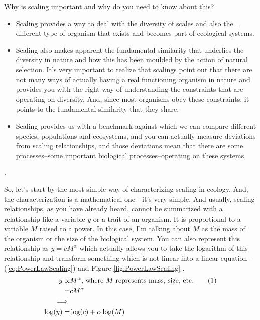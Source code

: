 \documentclass[]{article}
\newcommand\numberthis{\addtocounter{equation}{1}\tag{\theequation}}
\begin{document}
Why is scaling important and why do you need to know about this?
\begin{itemize}
	\item Scaling provides a way to deal with the diversity of scales and also the... different type of organism that exists and becomes part of ecological systems.
	\item Scaling also makes apparent the fundamental similarity that underlies the diversity in nature and how this has been moulded by the action of natural selection. It's very important to realize that scalings point out that there are not many ways of actually having a real functioning organism in nature and provides you with the right way of understanding the constraints that are operating on diversity. And, since most organisms obey these constraints, it points to the fundamental similarity that they share.

	\item Scaling provides us with a  benchmark against which we can compare different species, populations and ecosystems, and you can actually measure deviations from scaling relationships, and those deviations mean that there are some processes--some important biological processes--operating on these systems
\end{itemize}.

So, let's start by the most simple way of characterizing scaling in ecology.
And, the characterization is a mathematical one - it's very simple.
And usually, scaling relationships, as you have already heard, cannot be summarized with
a relationship like a variable $y$ or a trait of an organism.
It is proportional to a variable $M$ raised to a power.
In this case, I'm talking about $M$ as the mass of the organism or the size of the biological system. You can also represent this relationship as $y=c M^\alpha$ which actually allows you to take the logarithm of this relationship and transform something which is not linear into a linear equation--(\ref{eq:PowerLawScaling}) and Figure \ref{fig:PowerLawScaling} .
\begin{align*}
	y \propto& M^{\alpha}\text{, where $M$ represents mass, size, etc.}\numberthis\label{eq:PowerLawScaling}\\
	=& c M^{\alpha}\\
	\implies&\\
	\log(y)=&\log(c) + \alpha \log(M)
\end{align*}
\end{document}
